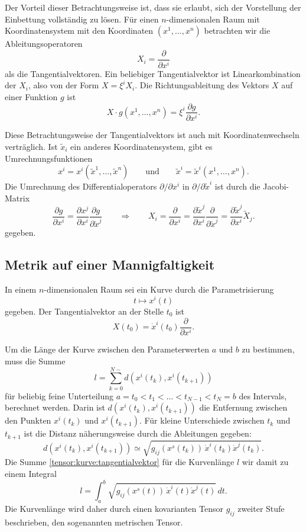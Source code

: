 Der Vorteil dieser Betrachtungsweise ist, dass sie erlaubt, sich
der Vorstellung der Einbettung vollständig zu lösen.
Für einen $n$-dimensionalen Raum mit Koordinatensystem mit den Koordinaten
$(x^1,\dots,x^n)$ betrachten wir die Ableitungsoperatoren 
\[
X_i = \frac{\partial}{\partial x^i}
\]
als die Tangentialvektoren.
Ein beliebiger Tangentialvektor ist Linearkombination der $X_i$, also
von der Form $X = \xi^i X_i$.
Die Richtungsableitung des Vektors $X$ auf einer Funktion $g$ ist
\[
X\cdot g(x^1,\dots,x^n)
=
\xi^i \frac{\partial g}{\partial x^i}.
\]

Diese Betrachtungsweise der Tangentialvektors ist auch mit
Koordinatenwechseln verträglich.
Ist $\tilde x_i$ ein anderes Koordinatensystem, gibt es Umrechnungsfunktionen
\[
x^i
=
x^i(\tilde x^1,\dots,\tilde x^n)
\qquad
\text{und}
\qquad
\tilde x^i
=
\tilde x^i(x^1,\dots,x^n).
\]
Die Umrechnung des Differentialoperators $\partial/\partial x^i$ in 
$\partial/\partial\tilde x^i$ ist durch die Jacobi-Matrix 
\[
\frac{\partial g}{\partial x^i}
=
\frac{\partial x^j}{\partial x^i}
\frac{\partial g}{\partial\tilde x^j}
\qquad\Rightarrow\qquad
X_i
=
\frac{\partial}{\partial x^i}
=
\frac{\partial\tilde x^j}{\partial x^i}
\frac{\partial}{\partial\tilde x^j}
=
\frac{\partial\tilde x^j}{\partial x^i} \tilde X_j.
\]
gegeben.

\subsection{Metrik auf einer Mannigfaltigkeit}
In einem $n$-dimensionalen Raum sei ein Kurve durch die Parametrisierung
\[
t
\mapsto
x^i(t)
\]
gegeben.
Der Tangentialvektor an der Stelle $t_0$ ist
\begin{equation}
X(t_0)
=
\dot x^i(t_0)
\frac{\partial}{\partial x^i}.
\label{tensor:kurve:tangentialvektor}
\end{equation}

Um die Länge der Kurve zwischen den Parameterwerten $a$ und $b$ zu bestimmen,
muss die Summe
\[
l = \sum_{k=0}^{N-} d(x^i(t_k),x^i(t_{k+1}))
\]
für beliebig feine Unterteilung $a=t_0<t_1<\dots <t_{N-1}<t_N=b$ des Intervals,
berechnet werden.
Darin ist $d(x^i(t_k), x^i(t_{k+1}))$ die Entfernung zwischen den Punkten
$x^i(t_k)$ und $x^i(t_{k+1})$.
Für kleine Unterschiede zwischen $t_k$ und $t_{k+1}$ ist die Distanz
näherungsweise durch die Ableitungen gegeben:
\[
d(x^i(t_k), x^i(t_{k+1}))
\simeq
\sqrt{g_{ij}(x^s(t_k))\,\dot x^i(t_k) \dot x^j(t_k)}.
\]
Die Summe
\eqref{tensor:kurve:tangentialvektor}
für die Kurvenlänge $l$ wir damit zu einem Integral
\begin{equation}
l=\int_a^b \sqrt{g_{ij}(x^s(t))\, \dot x^i(t) \dot x^j(t)}\,dt.
\label{tensor:kurve:kurvenlaenge}
\end{equation}
Die Kurvenlänge wird daher durch einen kovarianten Tensor $g_{ij}$ 
zweiter Stufe beschrieben, den sogenannten metrischen Tensor.

